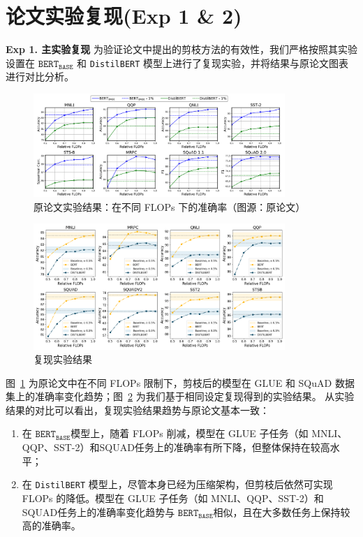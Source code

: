 \documentclass[UTF8,openany]{ctexbook}
\newcommand{\BERTBASE}{$\texttt{BERT}_{\texttt{BASE}}$}
\begin{document}
\section{论文实验复现(Exp 1 \& 2)}

\noindent\textbf{Exp 1. 主实验复现 } 为验证论文中提出的剪枝方法的有效性，我们严格按照其实验设置在 $\texttt{BERT}_{\texttt{BASE}}$ 和 \texttt{DistilBERT} 模型上进行了复现实验，并将结果与原论文图表进行对比分析。

\begin{figure}[H]
    \centering
    \includegraphics[width=0.85\textwidth]{img/yunlunwenzhu.png}
    \caption{原论文实验结果：在不同 FLOPs 下的准确率（图源：原论文）}
    \label{fig:original_results}
\end{figure}

\begin{figure}[H]
    \centering
    \includegraphics[width=0.85\textwidth]{img/ourzhu.png}
    \caption{复现实验结果}
    \label{fig:reproduced_results}
\end{figure}
图~\ref{fig:original_results} 为原论文中在不同 FLOPs 限制下，剪枝后的模型在 GLUE 和 SQuAD 数据集上的准确率变化趋势；图~\ref{fig:reproduced_results} 为我们基于相同设定复现得到的实验结果。
从实验结果的对比可以看出，复现实验结果趋势与原论文基本一致：

\begin{enumerate}[itemsep=0pt, topsep=0pt, parsep=0pt, partopsep=0pt, label=(\arabic*)]
    \item 在 \BERTBASE 模型上，随着 FLOPs 削减，模型在 GLUE 子任务（如 MNLI、QQP、SST-2）和SQUAD任务上的准确率有所下降，但整体保持在较高水平；
    \item 在 \texttt{DistilBERT} 模型上，尽管本身已经为压缩架构，但剪枝后依然可实现  FLOPs 的降低。模型在 GLUE 子任务（如 MNLI、QQP、SST-2）和SQUAD任务上的准确率变化趋势与 \BERTBASE 相似，且在大多数任务上保持较高的准确率。
\end{enumerate}
\end{document}
